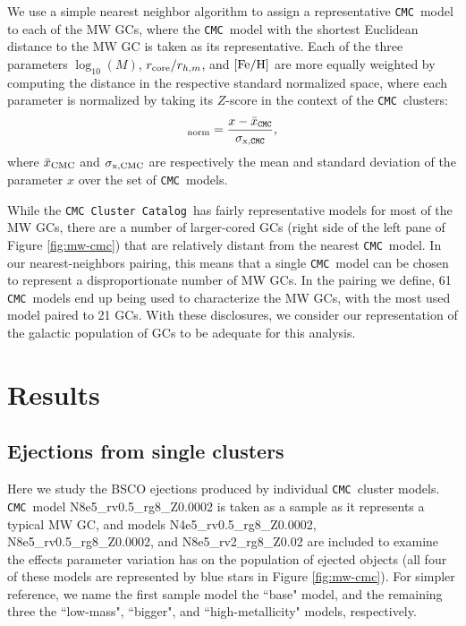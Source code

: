 \documentclass[twocolumn]{aastex631}
\newcommand{\CMC}{\texttt{CMC}}
\newcommand{\CMCcat}{\texttt{CMC Cluster Catalog}}
\begin{document}
We use a simple nearest neighbor algorithm to assign a representative \CMC\ model to each of the MW GCs, where the \CMC\ model with the shortest Euclidean distance to the MW GC is taken as its representative.
Each of the three parameters $\log_{10}(M)$, $r_{\rm core} / r_{h,m}$, and $[{\rm Fe/H}]$ are more equally weighted by computing the distance in the respective standard normalized space, where each parameter is normalized by taking its $Z$-score in the context of the \CMC\ clusters:
\begin{equation}
    [x]_{\rm norm} = \frac{x - \bar{x}_{\rm \CMC}}{\sigma_{\rm x, \CMC}},
\end{equation}
where $\bar{x}_{\rm CMC}$ and $\sigma_{\rm x,CMC}$ are respectively the mean and standard deviation of the parameter $x$ over the set of \CMC\ models.

While the \CMCcat\ has fairly representative models for most of the MW GCs, there are a number of larger-cored GCs (right side of the left pane of Figure \ref{fig:mw-cmc}) that are relatively distant from the nearest \CMC\ model.
In our nearest-neighbors pairing, this means that a single \CMC\ model can be chosen to represent a disproportionate number of MW GCs.
In the pairing we define, 61 \CMC\ models end up being used to characterize the MW GCs, with the most used model paired to 21 GCs.
With these disclosures, we consider our representation of the galactic population of GCs to be adequate for this analysis.

\section{Results} \label{sec:results}

\subsection{Ejections from single clusters} \label{subsec:single_clusters}

Here we study the BSCO ejections produced by individual \CMC\ cluster models.
\CMC\ model N8e5\_rv0.5\_rg8\_Z0.0002 is taken as a sample as it represents a typical MW GC, and models N4e5\_rv0.5\_rg8\_Z0.0002, N8e5\_rv0.5\_rg8\_Z0.0002, and N8e5\_rv2\_rg8\_Z0.02 are included to examine the effects parameter variation has on the population of ejected objects (all four of these models are represented by blue stars in Figure \ref{fig:mw-cmc}).
For simpler reference, we name the first sample model the ``base" model, and the remaining three the ``low-mass", ``bigger", and ``high-metallicity" models, respectively.
\end{document}
